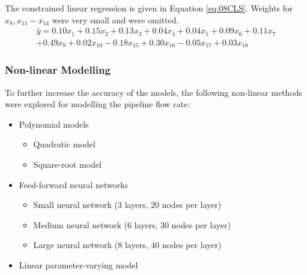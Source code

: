 The constrained linear regression is given in Equation \ref{eq:08CLS}.  Weights for $x_{8}, x_{11} - x_{14}$ were very small and were omitted.
\begin{multline}
    \hat{y} = 0.10x_1 + 0.15x_2 + 0.13x_3 + 0.04x_4 + 0.04x_5 + 0.09x_6 + 0.11x_7 \\
    + 0.49x_9 + 0.02x_{10}  - 0.18x_{15} + 0.30x_{16} - 0.05x_{17} + 0.03x_{18}
    \label{eq:08CLS}
\end{multline}

\subsubsection{Non-linear Modelling}
To further increase the accuracy of the models, the following non-linear methods were explored for modelling the pipeline flow rate:
\begin{itemize}
    \item Polynomial models
    \begin{itemize}
        \item Quadratic model
        \item Square-root model
    \end{itemize}
    \item Feed-forward neural networks
    \begin{itemize}
        \item Small neural network (3 layers, 20 nodes per layer)
        \item Medium neural network (6 layers, 30 nodes per layer)
        \item Large neural network (8 layers, 40 nodes per layer)
    \end{itemize}
    \item Linear parameter-varying model
\end{itemize}

